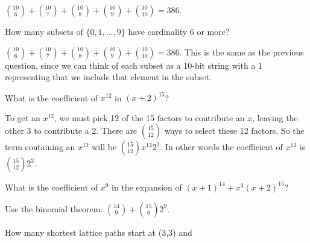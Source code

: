 \begin{questions}
  \begin{answer}
    ${10 \choose 6} + {10\choose 7} + {10\choose 8} + {10 \choose 9} + {10\choose 10} = 386$.
  \end{answer}

\question How many subsets of $\{0,1,\ldots, 9\}$ have cardinality 6 or more?

	\begin{answer}
	${10 \choose 6} + {10\choose 7} + {10\choose 8} + {10 \choose 9} + {10\choose 10} = 386$.  This is the same as the previous question, since we can think of each subset as a 10-bit string with a 1 representing that we include that element in the subset.
	\end{answer}



\question What is the coefficient of $x^{12}$ in $(x+2)^{15}$?

	\begin{answer}
		To get an $x^{12}$, we must pick 12 of the 15 factors to contribute an $x$, leaving the other 3 to contribute a 2.  There are ${15 \choose 12}$ ways to select these 12 factors.  So the term containing an $x^{12}$ will be ${15 \choose 12}x^{12}2^{3}$.  In other words the coefficient of $x^{12}$ is ${15\choose 12}2^3$.
	\end{answer}



\question What is the coefficient of $x^9$ in the expansion of $(x+1)^{14} + x^3(x+2)^{15}$?

  \begin{answer}
    Use the binomial theorem.  ${14\choose 9} + {15 \choose 6}2^9$.
  \end{answer}




   
\question How many shortest lattice paths start at (3,3) and


\end{questions}

